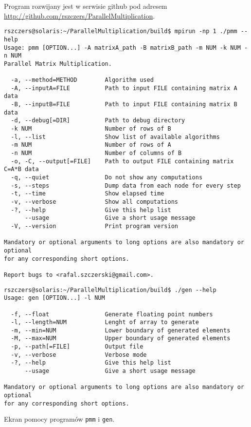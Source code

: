 

Program rozwijany jest w serwisie github pod adresem \url{http://github.com/rszczers/ParallelMultiplication}.

\begin{listing}[h]
\begin{verbatim}
rszczers@solaris:~/ParallelMultiplication/build$ mpirun -np 1 ./pmm --help
Usage: pmm [OPTION...] -A matrixA_path -B matrixB_path -m NUM -k NUM -n NUM
Parallel Matrix Multiplication.

  -a, --method=METHOD        Algorithm used
  -A, --inputA=FILE          Path to input FILE containing matrix A data
  -B, --inputB=FILE          Path to input FILE containing matrix B data
  -d, --debug[=DIR]          Path to debug directory
  -k NUM                     Number of rows of B
  -l, --list                 Show list of available algorithms
  -m NUM                     Number of rows of A
  -n NUM                     Number of columns of B
  -o, -C, --output[=FILE]    Path to output FILE containing matrix C=A*B data
  -q, --quiet                Do not show any computations
  -s, --steps                Dump data from each node for every step
  -t, --time                 Show elapsed time
  -v, --verbose              Show all computations
  -?, --help                 Give this help list
      --usage                Give a short usage message
  -V, --version              Print program version

Mandatory or optional arguments to long options are also mandatory or optional
for any corresponding short options.

Report bugs to <rafal.szczerski@gmail.com>.
\end{verbatim}
\begin{verbatim}
rszczers@solaris:~/ParallelMultiplication/build$ ./gen --help
Usage: gen [OPTION...] -l NUM

  -f, --float                Generate floating point numbers
  -l, --length=NUM           Lenght of array to generate
  -m, --min=NUM              Lower boundary of generated elements
  -M, --max=NUM              Upper boundary of generated elements
  -p, --path[=FILE]          Output file
  -v, --verbose              Verbose mode
  -?, --help                 Give this help list
      --usage                Give a short usage message

Mandatory or optional arguments to long options are also mandatory or optional
for any corresponding short options.
\end{verbatim}
\caption{Ekran pomocy programów \texttt{pmm} i \texttt{gen}.}
\label{ls:pmm_help}
\end{listing}